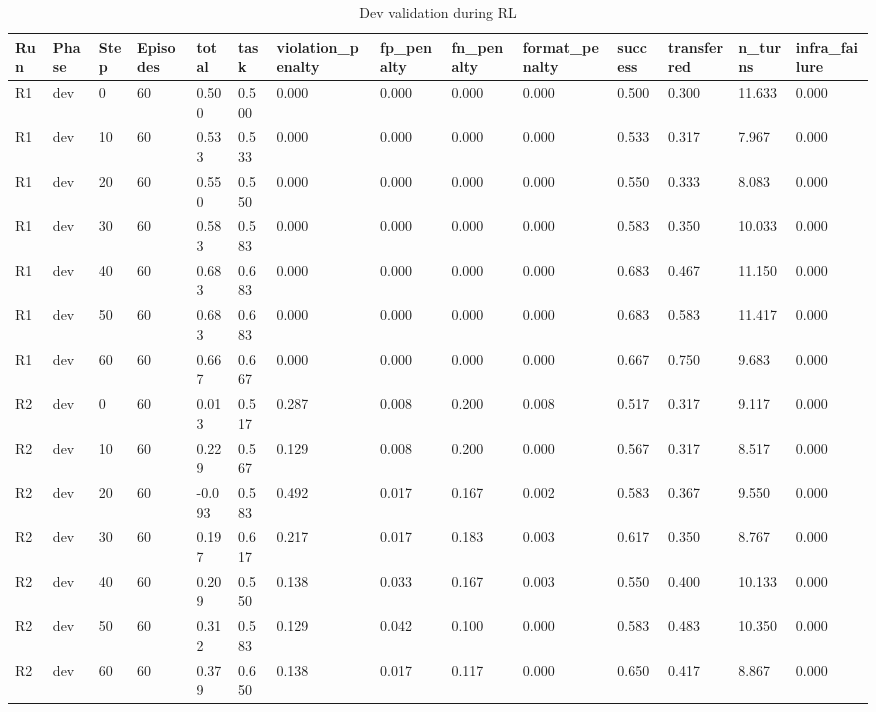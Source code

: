\begin{table}[t]
\centering
\caption{Dev validation during RL}
\begin{tabular}{llllllllllllll}
\hline
Run & Phase & Step & Episodes & total & task & violation\_penalty & fp\_penalty & fn\_penalty & format\_penalty & success & transferred & n\_turns & infra\_failure \\
\hline
R1 & dev & 0 & 60 & 0.500 & 0.500 & 0.000 & 0.000 & 0.000 & 0.000 & 0.500 & 0.300 & 11.633 & 0.000 \\
R1 & dev & 10 & 60 & 0.533 & 0.533 & 0.000 & 0.000 & 0.000 & 0.000 & 0.533 & 0.317 & 7.967 & 0.000 \\
R1 & dev & 20 & 60 & 0.550 & 0.550 & 0.000 & 0.000 & 0.000 & 0.000 & 0.550 & 0.333 & 8.083 & 0.000 \\
R1 & dev & 30 & 60 & 0.583 & 0.583 & 0.000 & 0.000 & 0.000 & 0.000 & 0.583 & 0.350 & 10.033 & 0.000 \\
R1 & dev & 40 & 60 & 0.683 & 0.683 & 0.000 & 0.000 & 0.000 & 0.000 & 0.683 & 0.467 & 11.150 & 0.000 \\
R1 & dev & 50 & 60 & 0.683 & 0.683 & 0.000 & 0.000 & 0.000 & 0.000 & 0.683 & 0.583 & 11.417 & 0.000 \\
R1 & dev & 60 & 60 & 0.667 & 0.667 & 0.000 & 0.000 & 0.000 & 0.000 & 0.667 & 0.750 & 9.683 & 0.000 \\
R2 & dev & 0 & 60 & 0.013 & 0.517 & 0.287 & 0.008 & 0.200 & 0.008 & 0.517 & 0.317 & 9.117 & 0.000 \\
R2 & dev & 10 & 60 & 0.229 & 0.567 & 0.129 & 0.008 & 0.200 & 0.000 & 0.567 & 0.317 & 8.517 & 0.000 \\
R2 & dev & 20 & 60 & -0.093 & 0.583 & 0.492 & 0.017 & 0.167 & 0.002 & 0.583 & 0.367 & 9.550 & 0.000 \\
R2 & dev & 30 & 60 & 0.197 & 0.617 & 0.217 & 0.017 & 0.183 & 0.003 & 0.617 & 0.350 & 8.767 & 0.000 \\
R2 & dev & 40 & 60 & 0.209 & 0.550 & 0.138 & 0.033 & 0.167 & 0.003 & 0.550 & 0.400 & 10.133 & 0.000 \\
R2 & dev & 50 & 60 & 0.312 & 0.583 & 0.129 & 0.042 & 0.100 & 0.000 & 0.583 & 0.483 & 10.350 & 0.000 \\
R2 & dev & 60 & 60 & 0.379 & 0.650 & 0.138 & 0.017 & 0.117 & 0.000 & 0.650 & 0.417 & 8.867 & 0.000 \\
\hline
\end{tabular}
\end{table}
